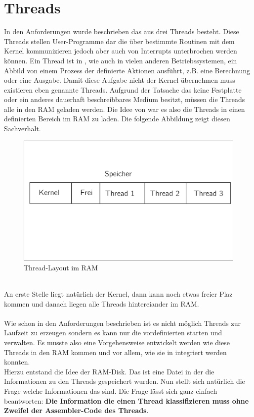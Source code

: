 \section{Threads}
In den Anforderungen wurde beschrieben das \mops aus drei Threads besteht. Diese Threads stellen User-Programme dar die \"uber bestimmte Routinen mit dem Kernel kommunizieren jedoch aber auch von Interrupts unterbrochen werden k\"onnen. Ein Thread ist in \mops, wie auch in vielen anderen Betriebssystemen, ein Abbild von einem Prozess der definierte Aktionen ausf\"uhrt, z.B. eine Berechnung oder eine Ausgabe. Damit diese Aufgabe nicht der Kernel \"ubernehmen muss existieren eben genannte Threads. Aufgrund der Tatsache das \mops keine Festplatte oder ein anderes dauerhaft beschreibbares Medium besitzt, m\"ussen die Threads alle in den RAM geladen werden. Die Idee von \mops war es also die Threads in einen definierten Bereich im RAM zu laden. Die folgende Abbildung zeigt diesen Sachverhalt.
\begin{figure}[h!]
	\centering
	\includegraphics[scale=0.60]{common/draft-thread-overview.pdf}	
	\caption{Thread-Layout im RAM}
	\label{draft:draft-thread-overview}
\end{figure}\\
An erste Stelle liegt nat\"urlich der Kernel, dann kann noch etwas freier Plaz kommen und danach liegen alle Threads hintereiander im RAM.
\\\\
Wie schon in den Anforderungen beschrieben ist es \mops nicht m\"oglich Threads zur Laufzeit zu erzeugen sondern es kann nur die vordefinierten starten und verwalten. Es musste also eine Vorgehensweise entwickelt werden wie diese Threads in den RAM kommen und vor allem, wie sie in \mops integriert werden konnten. \\
Hierzu entstand die Idee der RAM-Disk. Das ist eine Datei in der die Informationen zu den Threads gespeichert wurden. Nun stellt sich nat\"urlich die Frage welche Informationen das sind. Die Frage l\"asst sich ganz einfach beantworten: \textbf{Die Information die einen Thread klassifizieren muss ohne Zweifel der Assembler-Code des Threads}. 
